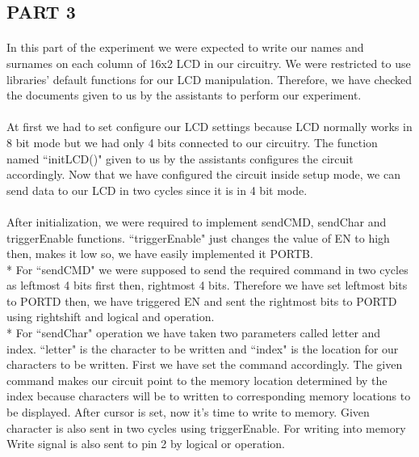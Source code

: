 \documentclass[pdftex,12pt,a4paper]{article}
\begin{document}
\begin{flushleft}
\subsection{PART 3}
\paragraph{}
In this part of the experiment we were expected to write our names and surnames on each column of 16x2 LCD in our circuitry. We were restricted to use libraries' default functions for our LCD manipulation. Therefore, we have checked the documents given to us by the assistants to perform our experiment.
\paragraph{}
At first we had to set configure our LCD settings because LCD normally works in 8 bit mode but we had only 4 bits connected to our circuitry. The function named ``initLCD()" given to us by the assistants configures the circuit accordingly. Now that we have configured the circuit inside setup mode, we can send data to our LCD in two cycles since it is in 4 bit mode. 
\paragraph{}
After initialization, we were required to implement sendCMD, sendChar and triggerEnable functions. ``triggerEnable" just changes the value of EN to high then, makes it low so, we have easily implemented it PORTB. \\*
For ``sendCMD" we were supposed to send the required command in two cycles as leftmost 4 bits first then, rightmost 4 bits. Therefore we have set leftmost bits to PORTD then, we have triggered EN and sent the rightmost bits to PORTD using rightshift and logical and operation.\\*
For ``sendChar" operation we have taken two parameters called letter and index. ``letter" is the character to be written and ``index" is the location for our characters to be written. First we have set the command accordingly. The given command makes our circuit point to the memory location determined by the index because characters will be to written to corresponding memory locations to be displayed. After cursor is set, now it's time to write to memory. Given character is also sent in two cycles using triggerEnable. For writing into memory Write signal is also sent to pin 2 by logical or operation.

\end{flushleft}
\end{document}
